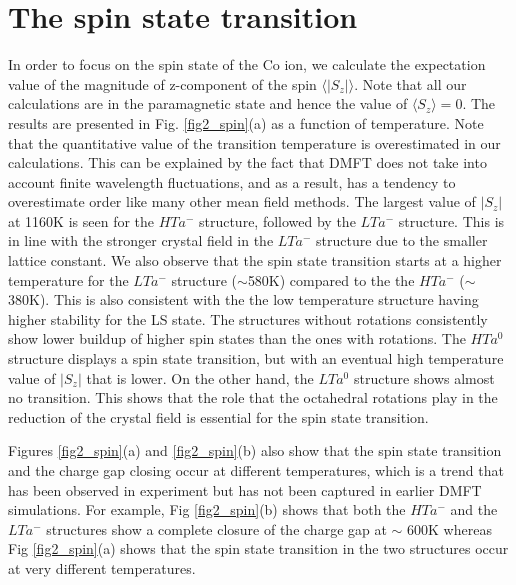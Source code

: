 \documentclass[10pt]{ruthesis}
\begin{document}
{\section{The spin state transition} 
In order to focus on the spin state of the Co ion, we calculate the expectation value of the magnitude of z-component of the spin $\langle|S_z|\rangle$. Note that all our calculations are in the paramagnetic state and hence the value of $\langle S_z \rangle=0$. The results are presented in Fig. \ref{fig2_spin}(a) as a function of temperature. Note that the quantitative value of the transition temperature is overestimated in our calculations. This can be explained by the fact that DMFT does not take into account finite wavelength fluctuations, and as a result, has a tendency to overestimate order like many other mean field methods.
The largest value of $|S_z|$ at 1160K is seen for the $HTa^-$ structure, followed by the $LTa^-$ structure. 
%
This is in line with the stronger crystal field in the $LTa^-$ structure due to the smaller lattice constant.
We also observe that  the spin state transition starts at a higher temperature for the $LTa^-$ structure ($\sim$580K) compared to the the $HTa^-$ ($\sim$380K). This is also consistent with the the low temperature structure having higher stability for the LS state. 
The structures without rotations consistently show lower buildup of higher spin states than the ones with rotations. The $HTa^0$ structure displays a spin state transition, but with an eventual high temperature value of $|S_z|$ that is lower. On the other hand, the $LTa^0$ structure shows almost no transition. This shows that the role that the octahedral rotations play in the reduction of the crystal field is essential for the spin state transition.

Figures \ref{fig2_spin}(a) and \ref{fig2_spin}(b) also show that the spin state transition and the charge gap closing occur at different temperatures, which is a trend that has been observed in experiment but has not been captured in earlier DMFT simulations. For example, Fig \ref{fig2_spin}(b) shows that both the $HTa^-$ and the $LTa^-$ structures show a complete closure of the charge gap at $\sim$ 600K whereas Fig \ref{fig2_spin}(a) shows that the spin state transition in the two structures occur at very different temperatures. 

}
\end{document}
